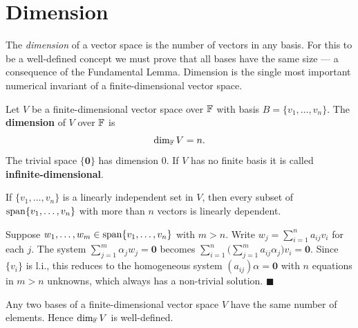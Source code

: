 \section{Dimension}
\label{sec:dimension}

The \emph{dimension} of a vector space is the number of vectors in any basis.
For this to be a well-defined concept we must prove that all bases have the
same size — a consequence of the Fundamental Lemma.  Dimension is the single
most important numerical invariant of a finite-dimensional vector space.

\begin{defbox}
\label{def:dimension}
Let $V$ be a finite-dimensional vector space over $\mathbb{F}$ with basis
$B=\{v_1,\ldots,v_n\}$.  The \textbf{dimension} of $V$ over $\mathbb{F}$ is
\[
    \operatorname{dim}_{\mathbb{F}} V = n.
\]
The trivial space $\{\mathbf{0}\}$ has dimension $0$.  If $V$ has no finite
basis it is called \textbf{infinite-dimensional}.
\end{defbox}

\begin{thmbox}
\label{thm:fundamental-lemma}
If $\{v_1,\ldots,v_n\}$ is a linearly independent set in $V$, then every
subset of $\operatorname{span}\{v_1,\ldots,v_n\}$ with more than $n$ vectors is linearly
dependent.
\end{thmbox}

\begin{proofbox}
Suppose $w_1,\ldots,w_m\in\operatorname{span}\{v_1,\ldots,v_n\}$ with $m>n$.  Write
$w_j=\sum_{i=1}^n a_{ij}v_i$ for each $j$.  The system
$\sum_{j=1}^m\alpha_j w_j=\mathbf{0}$ becomes
$\sum_{i=1}^n\!\bigl(\sum_{j=1}^m a_{ij}\alpha_j\bigr)v_i=\mathbf{0}$.
Since $\{v_i\}$ is l.i., this reduces to the homogeneous system
$(a_{ij})\alpha=\mathbf{0}$ with $n$ equations in $m>n$ unknowns, which
always has a non-trivial solution.
\hfill$\blacksquare$
\end{proofbox}

\begin{thmbox}
\label{thm:dimension-well-defined}
Any two bases of a finite-dimensional vector space $V$ have the same number of
elements.  Hence $\operatorname{dim}_{\mathbb{F}} V$ is well-defined.
\end{thmbox}

